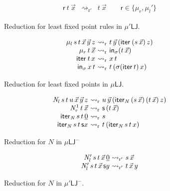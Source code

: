 \documentclass[10pt,a4paper]{amsart}
\theoremstyle{plain}
\theoremstyle{definition}
\theoremstyle{plain}
\theoremstyle{definition} %
\renewcommand{\succ}{\mathsf s}
\newcommand{\numeral}[1]{\underline{#1}}
\newcommand{\nat}{\mathit{N}}
\newcommand{\N}{\nat} %
\newcommand{\mulunf}{\lr \mu'}
\newcommand{\iter}[1]{\mathsf{iter}_{#1}}
\newcommand{\inj}{\mathsf{in}}
\newcommand{\injX}[1]{\inj_{#1}}
\newcommand{\Nsucc}{\rr\N^1}
\newcommand{\Ncnd}{\lr \N'}
\newcommand{\Niter}{\iter \N}
\newcommand{\infrule}{\mathsf{r}}
\newcommand{\rrule}{\infrule} %
\newcommand{\lr}[1]{#1_l}
\newcommand{\rr}[1]{#1_r}
\newcommand{\LJ}{\mathsf{LJ}}
\newcommand{\muLJ}{\mu\LJ}
\newcommand{\muLJnorec}{\mu'\LJ}
\newcommand{\muLJneg}{\muLJ^-}
\newcommand{\muLJnegnorec}{\muLJnorec^-}
\newcommand{\rewrite}{\rightsquigarrow}
\newcommand{\reduction}{\mathrm{r}}
\newcommand{\reduces}{\rewrite_{\reduction}}
\newcommand{\reductionnorec}{\mathrm{r}'}
\newcommand{\reducesnorec}{\rewrite_{\reductionnorec}}
\begin{document}
\begin{figure}
    \centering
    \[
\begin{array}{rcl}
 \rrule \ t \ \vec x &\reducesnorec&  t \ \vec x \qquad  \rrule\in \{\rr \mu, \mulunf \} 
\end{array}
\]
    \caption{Reduction for least fixed point rules in $\muLJnorec$. }
    \label{fig:reduction-mu-norec}
\end{figure}

\begin{figure}
    \[
    \begin{array}{r@{\ \reduces\ }l}
         \lr \mu \, s \, t\, \vec x\, \vec y\, z & t\, \vec y\, (\iter{}\, (s\, \vec x)\, z) \\
         \rr \mu\, t\, \vec x & \injX\sigma (t\, \vec x) \\
         \iter{}\, t\, x & x\, t \\
         \injX \sigma\,  x\, t & t\, (\sigma(\iter\, t)\, x)
    \end{array}
    \]
    \caption{Reduction for least fixed points in $\muLJ$.}
    \label{fig:reduction-mu-iter}
\end{figure}


\begin{figure}
  \[
   \begin{array}{r@{\ \reduces\ }l}
         \lr \N\, s\, t\, u\, \vec x\, \vec y\, z & u\, \vec y\, (\Niter\, (s\, \vec x)\, (t\, \vec x)\, z) \\
        { \Nsucc \, t \, \vec x  }&{ \succ \, (t\, \vec x) } \\
         \Niter\, s\, t\, \numeral 0 & s \\
         \Niter\, s\, t\, \succ x & t\, (\Niter \, s\, t\, x)
    \end{array}
  \]
    \caption{Reduction for $\N$ in $\muLJneg$}
    \label{fig:reduction-N-muLJ}
\end{figure}


\begin{figure}
   \[
   \begin{array}{r@{\ \reducesnorec\ }l}
        \Ncnd \, s\, t\, \vec x\, \numeral 0 & s\, \vec x \\
        \Ncnd \, s\, t\, \vec x\, \succ y & t\, \vec x\, y
   \end{array}
   \]
    \caption{Reduction for $\N$ in $\muLJnegnorec$.}
    \label{fig:reduction-N-muLJnorec}
\end{figure}
\end{document}

